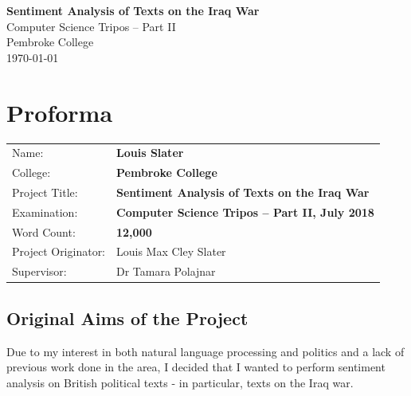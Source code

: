 \documentclass[12pt,a4paper,twoside,openright]{report}
\begin{document}





\pagestyle{empty}


\vspace*{60mm}
\begin{center}
\Huge
\textbf{Sentiment Analysis of Texts on the Iraq War} \\[5mm]
Computer Science Tripos -- Part II \\[5mm]
Pembroke College \\[5mm]
\today  %
\end{center}


\pagestyle{plain}

\chapter*{Proforma}

{\large
\begin{tabular}{ll}
Name:               & \bf Louis Slater                       \\
College:            & \bf Pembroke College                     \\
Project Title:      & \bf Sentiment Analysis of Texts on the Iraq War \\
Examination:        & \bf Computer Science Tripos -- Part II, July 2018  \\
Word Count:         & \bf 12,000  \\
Project Originator: & Louis Max Cley Slater                    \\
Supervisor:         & Dr Tamara Polajnar                    \\ 
\end{tabular}
}


\section*{Original Aims of the Project}

Due to my interest in both natural language processing and politics and a lack of previous work done in the area, I decided that I wanted to perform sentiment analysis on British political texts - in particular, texts on the Iraq war.
\end{document}
